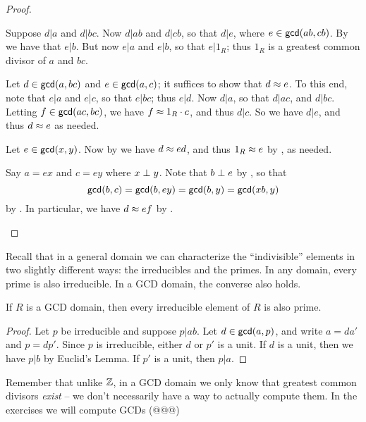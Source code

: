 \begin{proof}
\begin{inlineproplist}
\item Suppose \(d|a\) and \(d|bc\).
Now \(d|ab\) and \(d|cb\), so that \(d|e\), where \(e \in \mathsf{gcd}(ab, cb)\).
By  we have that \(e|b\).
But now \(e|a\) and \(e|b\), so that \(e|1_R\); thus \(1_R\) is a greatest common divisor of \(a\) and \(bc\).
\item Let \(d \in \mathsf{gcd}(a, bc)\) and \(e \in \mathsf{gcd}(a, c)\); it suffices to show that \(d \approx e\).
To this end, note that \(e|a\) and \(e|c\), so that \(e|bc\); thus \(e|d\).
Now \(d|a\), so that \(d|ac\), and \(d|bc\).
Letting \(f \in \mathsf{gcd}(ac, bc)\), we have \(f \approx 1_R \cdot c\), and thus \(d|c\).
So we have \(d|e\), and thus \(d \approx e\) as needed.
\item Let \(e \in \mathsf{gcd}(x, y)\).
Now by  we have \(d \approx ed\), and thus \(1_R \approx e\) by , as needed.
\item Say \(a = ex\) and \(c = ey\) where \(x \perp y\).
Note that \(b \perp e\) by , so that \[ \mathsf{gcd}(b, c) = \mathsf{gcd}(b, ey) = \mathsf{gcd}(b, y) = \mathsf{gcd}(xb, y) \] by .
In particular, we have \(d \approx ef\) by .
\end{inlineproplist}
\end{proof}

Recall that in a general domain we can characterize the ``indivisible'' elements in two slightly different ways: the irreducibles and the primes.
In any domain, every prime is also irreducible.
In a GCD domain, the converse also holds.

\begin{prop} \label{prop:gcd-irreducible-implies-prime}
If \(R\) is a GCD domain, then every irreducible element of \(R\) is also prime.
\end{prop}

\begin{proof}
Let \(p\) be irreducible and suppose \(p|ab\).
Let \(d \in \mathsf{gcd}(a, p)\), and write \(a = da'\) and \(p = dp'\).
Since \(p\) is irreducible, either \(d\) or \(p'\) is a unit.
If \(d\) is a unit, then we have \(p|b\) by Euclid's Lemma.
If \(p'\) is a unit, then \(p|a\).
\end{proof}

Remember that unlike \(\mathbb{Z}\), in a GCD domain we only know that greatest common divisors \emph{exist} -- we don't necessarily have a way to actually compute them.
In the exercises we will compute GCDs (@@@)



